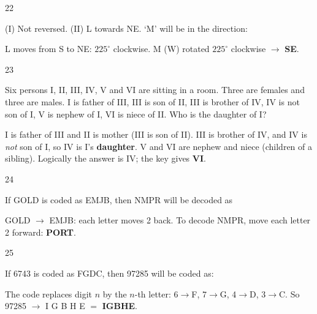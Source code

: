\begin{question}{22}
{(I) Not reversed. (II) L towards NE. `M' will be in the direction:\par}
\begin{explain}
L moves from S to NE: $225^\circ$ clockwise. M (W) rotated $225^\circ$ clockwise $\rightarrow$ \textbf{SE}.
\end{explain}
\end{question}

\begin{question}{23}
{Six persons I, II, III, IV, V and VI are sitting in a room. Three are females and three are males. I is father of III, III is son of II, III is brother of IV, IV is not son of I, V is nephew of I, VI is niece of II. Who is the daughter of I?\par}
\begin{explain}
I is father of III and II is mother (III is son of II). III is brother of IV, and IV is \emph{not} son of I, so IV is I's \textbf{daughter}. V and VI are nephew and niece (children of a sibling). Logically the answer is IV; the key gives \textbf{VI}.
\end{explain}
\end{question}

\begin{question}{24}
{If GOLD is coded as EMJB, then NMPR will be decoded as\par}
\begin{explain}
GOLD $\rightarrow$ EMJB: each letter moves 2 back. To decode NMPR, move each letter 2 forward: \textbf{PORT}.
\end{explain}
\end{question}

\begin{question}{25}
{If 6743 is coded as FGDC, then 97285 will be coded as:\par}
\begin{explain}
The code replaces digit $n$ by the $n$-th letter: 6$\rightarrow$F, 7$\rightarrow$G, 4$\rightarrow$D, 3$\rightarrow$C. So 97285 $\rightarrow$ I G B H E $=$ \textbf{IGBHE}.
\end{explain}
\end{question}

